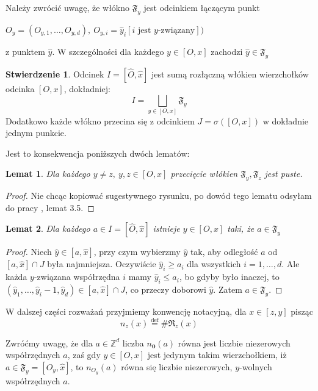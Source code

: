 \documentclass[licencjacka]{pracamgr}
\theoremstyle{definition}
\theoremstyle{definition}
\theoremstyle{definition}
\newtheorem{proposition}{Stwierdzenie}[section]
\theoremstyle{definition}
\theoremstyle{definition}
\theoremstyle{plain}
\newtheorem{lemma}{Lemat}[section]
\theoremstyle{plain}
\begin{document}

Należy zwrócić uwagę, że włókno $ \mathfrak{F}_y $ jest odcinkiem łączącym punkt 

$ O_y =(O_{y,1}, \dots, O_{y,d}), ~O_{y,i} = \hat y_i[ i \text{ jest } y \text{-związany}]) $

z punktem $\hat y$. W szczególności dla każdego $ y \in [O,x] $ zachodzi $ \hat y \in 
\mathfrak{F}_y $

\begin{proposition}
	Odcinek $ I = [\hat O, \hat x] $ jest sumą rozłączną włókien wierzchołków 
	odcinka $ [O, x] $, dokładniej:
	$$ I = \bigsqcup\limits_{y \in [O,x]} \mathfrak{F}_y $$
	Dodatkowo każde włókno przecina się z odcinkiem $ J = \sigma([O,x]) $ w dokładnie 
	jednym punkcie.
\end{proposition}
Jest to konsekwencja poniższych dwóch lematów:
\begin{lemma}
	Dla każdego $ y \neq z, ~ y,z \in [O,x] $ przecięcie włókien $ \mathfrak{F}_y, 
	\mathfrak{F}_z $ jest puste.
\end{lemma}

\begin{proof}
	Nie chcąc kopiować sugestywnego rysunku, po dowód tego lematu odsyłam do pracy 
	\cite{brodzki}, lemat 3.5.
\end{proof}

\begin{lemma}
	Dla każdego $ a \in I = [\hat O, \hat x] $ istnieje $ y \in [O,x] $ taki, że 
	$ a \in \mathfrak{F}_y $
\end{lemma}
\begin{proof}
	Niech $ \hat y  \in [a,\hat x] $, przy czym wybierzmy $ \hat y $ tak, aby odległość 
	$ a $ od $ [a, \hat x] \cap J $ 
	była najmniejsza. Oczywiście $ \hat y_i \geq a_i $ dla wszystkich $ i = 1, \dots, 
	d $. Ale każda $ y $-związana współrzędna $ i $ mamy $ \hat y_i \leq a_i$, bo gdyby 
	było inaczej, to $ (\hat y_1, \dots, \hat y_i - 1, \hat y_d) \in [a, \hat x] \cap J $, 
	co przeczy doborowi $ \hat y $. Zatem $ a \in \mathfrak{F}_y $.
\end{proof}

W dalszej części rozważań przyjmiemy konwencję notacyjną, dla $ x \in[z,y] $ pisząc 
$$ n_z(x) \stackrel{\text{def}}{=} \# \mathfrak{R}_z(x) $$

Zwróćmy uwagę, że dla $ a \in \mathbb{Z}^d $ liczba $  n_{\textbf{0}}(a)$ równa jest 
liczbie niezerowych współrzędnych $ a $, zaś gdy $ y\in[O,x] $ jest jedynym takim 
wierzchołkiem, iż $ a \in \mathfrak{F}_y = [O_y, \hat x]$, to $ n_{O_y}(a) $ równa się 
liczbie niezerowych, $ y $-wolnych współrzędnych $ a $.
\end{document}

